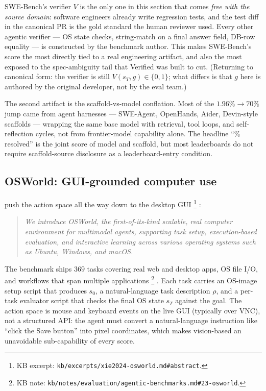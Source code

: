 \begin{intuition}
SWE-Bench's verifier $V$ is the only one in this section that comes
\emph{free with the source domain}: software engineers already write
regression tests, and the test diff in the canonical PR is the gold
standard the human reviewer used. Every other agentic verifier ---
OS state checks, string-match on a final answer field, DB-row
equality --- is constructed by the benchmark author. This makes
SWE-Bench's score the most directly tied to a real engineering
artifact, and also the most exposed to the spec-ambiguity tail that
Verified was built to cut. (Returning to canonical form: the verifier
is still $V(s_T, g) \in \{0, 1\}$; what differs is that $g$ here is
authored by the original developer, not by the eval team.)
\end{intuition}

The second artifact is the scaffold-vs-model conflation. Most of the
$1.96\% \to 70\%$ jump came from agent harnesses --- SWE-Agent,
OpenHands, Aider, Devin-style scaffolds --- wrapping the same base
model with retrieval, tool loops, and self-reflection cycles, not
from frontier-model capability alone. The headline ``\% resolved'' is
the joint score of model and scaffold, but most leaderboards do not
require scaffold-source disclosure as a leaderboard-entry condition.

\subsection{OSWorld: GUI-grounded computer use}
\label{sec:agentic-osworld}

\citet{xie2024-osworld} push the action space all the way down to the
desktop GUI%
\footnote{KB excerpt: \nolinkurl{kb/excerpts/xie2024-osworld.md#abstract}.}
\citep[\S{}abstract]{xie2024-osworld}:

\begin{quote}\itshape
We introduce OSWorld, the first-of-its-kind scalable, real computer
environment for multimodal agents, supporting task setup, execution-based
evaluation, and interactive learning across various operating systems
such as Ubuntu, Windows, and macOS.
\end{quote}

The benchmark ships $369$ tasks covering real web and desktop apps,
OS file I/O, and workflows that span multiple applications%
\footnote{KB note: \nolinkurl{kb/notes/evaluation/agentic-benchmarks.md#23-osworld}.}
\citep[\S{}abstract]{xie2024-osworld}. Each task carries an OS-image
setup script that produces $s_0$, a natural-language task description
$\rho$, and a per-task evaluator script that checks the final OS
state $s_T$ against the goal. The action space is mouse and keyboard
events on the live GUI (typically over VNC), not a structured API:
the agent must convert a natural-language instruction like ``click
the Save button'' into pixel coordinates, which makes vision-based
 an unavoidable sub-capability of every score.

